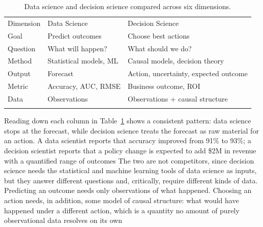 \begin{table}[!t]
  \caption{Data science and decision science compared across six dimensions.}
  \label{tab:data-science-vs-decision-science}
  \begin{tabular}{p{2.3cm}p{4.3cm}p{4.7cm}}
    \hline
    \noalign{\smallskip} Dimension                        & Data Science           & Decision Science                      \\
    \noalign{\smallskip}\svhline\noalign{\smallskip} Goal & Predict outcomes       & Choose best actions                   \\
    Question                                              & What will happen?      & What should we do?                    \\
    Method                                                & Statistical models, ML & Causal models, decision theory        \\
    Output                                                & Forecast               & Action, uncertainty, expected outcome \\
    Metric                                                & Accuracy, AUC, RMSE    & Business outcome, ROI                 \\
    Data                                                  & Observations           & Observations + causal structure       \\
    \noalign{\smallskip}                                   \hline
    \noalign{\smallskip}
  \end{tabular}
\end{table}

Reading down each column in Table~\ref{tab:data-science-vs-decision-science} shows
a consistent pattern: data science stops at the forecast, while decision science
treats the forecast as raw material for an action. A data scientist reports that
accuracy improved from 91\% to 93\%; a decision scientist reports that a policy change
is expected to add \$2M in revenue with a quantified range of outcomes The two
are not competitors, since decision science needs the statistical and machine learning
tools of data science as inputs, but they answer different questions and, critically,
require different kinds of data. Predicting an outcome needs only observations of
what happened. Choosing an action needs, in addition, some model of causal
structure: what would have happened under a different action, which is a
quantity no amount of purely observational data resolves on its own

